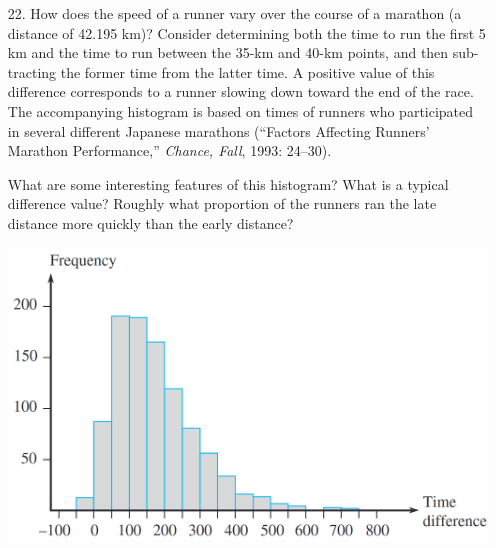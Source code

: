 \documentclass[letterpaper,12pt]{article}
\begin{document}
\begin{enumerate}
\begin{enumerate}
    \end{enumerate}
  \item[22.]
    How does the speed of a runner vary over the course of a marathon (a distance of 42.195 km)? Consider determining both the time to run the first 5 km and the time to run between the 35-km and 40-km points, and then sub-
    tracting the former time from the latter time. A positive value of this difference corresponds to a runner slowing down toward the end of the race. The accompanying histogram is based on times of runners who participated in several different Japanese marathons (``Factors Affecting Runners’ Marathon Performance,'' \textit{Chance, Fall}, 1993: 24–30).

    What are some interesting features of this histogram? What is a typical difference value? Roughly what proportion of the runners ran the late distance more quickly than the early distance?

    \begin{center}
      \includegraphics[scale=0.3]{../resources/01_02_22_01.png}
    \end{center}
\end{enumerate}
\end{document}

